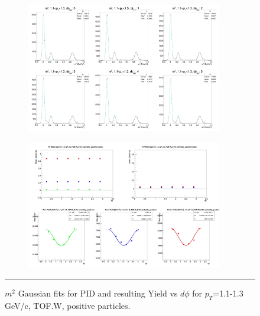 \begin{figure}[H]
  \centering
    \begin{subfigure}[p]{1\textwidth}
   \centering
   \includegraphics[width=0.94\textwidth]{lowptfits/yieldvsdphi_tof1_cent0_ch1_pT-11-13.jpg}
    \end{subfigure}
    \begin{subfigure}[p]{1\textwidth}
   \centering
   \includegraphics[width=0.94\textwidth]{lowptfits/fitParams_tof1_cent0_ch1_pT-11-13.jpg}
    \end{subfigure}
    \rule{35em}{0.5pt}
  \caption[PID fits and Yield vs $d\phi$ for $p_T$=1.1-1.3 GeV/c, TOF.W, positive particles. ]{$m^2$ Gaussian fits for PID and resulting Yield vs $d\phi$ for $p_T$=1.1-1.3 GeV/c, TOF.W, positive particles.}
  \label{fig:fits11-13pos}
\end{figure}



